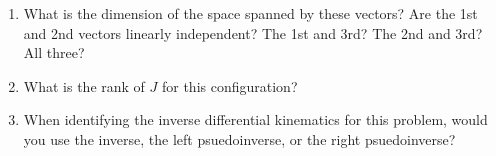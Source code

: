 \documentclass{16384_doc} %
\begin{document}
\begin{questions}
\begin{enumerate} [label=\alph*.]
        \item \text{[2 points]} What is the dimension of the space spanned by these vectors? Are
        the 1st and 2nd vectors linearly independent? The 1st and 3rd?  The 2nd
        and 3rd? All three?
        \begin{tcolorbox}[height=3cm]
        \end{tcolorbox}
        
        \item \text{[1 point]} What is the rank of $J$ for this configuration?
        \begin{tcolorbox}[height=3cm]
        \end{tcolorbox}
        
        \item \text{[2 points]} When identifying the inverse differential kinematics for this
        problem, would you use the inverse, the left psuedoinverse, or the right
        psuedoinverse?
        \begin{tcolorbox}[height=3cm]
        \end{tcolorbox}
    \end{enumerate}



\end{questions}
\end{document}
